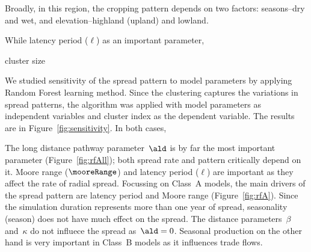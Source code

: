 Broadly, in this region, the cropping pattern depends on two factors:
seasons--dry and wet, and elevation--highland (upland) and lowland. %


While latency
period ($\ell$)  as an important parameter, 

cluster size

We studied sensitivity of the
spread pattern to model parameters by applying Random Forest learning
method. Since the clustering captures the variations in spread patterns,
the algorithm was applied with model parameters as independent variables
and cluster index as the dependent variable. The results are in
Figure~\ref{fig:sensitivity}. In both cases, 

The long distance pathway parameter~$\ald$ is by far the most important
parameter (Figure~\ref{fig:rfAll}); both spread rate and pattern critically
depend on it. Moore range ($\mooreRange$) and latency period ($\ell$) are
important as they affect the rate of radial spread. Focussing
on Class~A models, the main drivers of the spread pattern are latency
period and Moore range (Figure~\ref{fig:rfA}). Since the simulation
duration represents more than one year of spread, seasonality (season) does
not have much effect on the spread. The distance parameters~$\beta$
and~$\kappa$ do not influece the spread as~$\ald=0$. Seasonal production on
the other hand is very important in Class~B models as it influences trade
flows.

